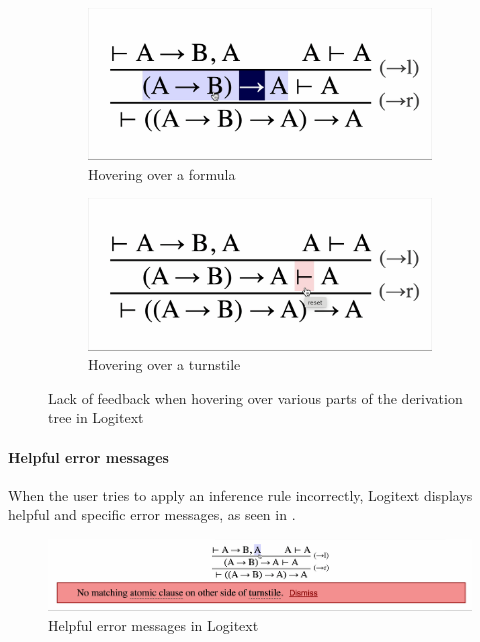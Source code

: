 \begin{figure}[!htbp]
    \centering
    \begin{subfigure}{.48\textwidth}
        \centering
        \includegraphics[width=\textwidth]{background/logitext-formula.png}
        \caption{Hovering over a formula}
    \end{subfigure}%
    \quad
    \begin{subfigure}{.48\textwidth}
        \centering
        \includegraphics[width=\textwidth]{background/logitext-turnstile.png}
        \caption{Hovering over a turnstile}
    \end{subfigure}
    \caption{Lack of feedback when hovering over various parts of the derivation tree in Logitext}
    \label{fig:comparison:logitext}
\end{figure}

\paragraph{Helpful error messages}
When the user tries to apply an inference rule incorrectly, Logitext displays helpful and specific error messages, as seen in .

\begin{figure}[!htbp]
    \centering
    \includegraphics[width=\textwidth]{background/logitext-error.png}
    \caption{Helpful error messages in Logitext}
    \label{fig:comparison:logitext-error}
\end{figure}

